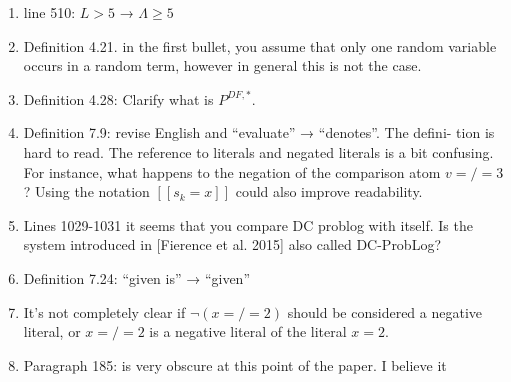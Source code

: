 \begin{enumerate}
\item line 510: $L > 5$ → $\Lambda \geq 5$
\\
\item Definition 4.21. in the first bullet, you assume that only one random
variable occurs in a random term, however in general this is not the case.
\\
\item Definition 4.28: Clarify what is $P^{DF,*}$.
\\
\item Definition 7.9: revise English and “evaluate” → “denotes”. The defini-
tion is hard to read. The reference to literals and negated literals is a
bit confusing. For instance, what happens to the negation of the comparison atom $v =/= 3$? Using the notation $[[s_k = x]]$ could also improve
readability.
\\
\item Lines 1029-1031 it seems that you compare DC problog with itself. Is the
system introduced in [Fierence et al. 2015] also called DC-ProbLog?
\\
\item Definition 7.24: “given is” → “given”
\\
\item It’s not completely clear if $\neg(x =/= 2)$ should be considered a negative
literal, or $x =/= 2$ is a negative literal of the literal $x=2$.
\\
\item Paragraph 185: is very obscure at this point of the paper. I believe it

\end{enumerate}
